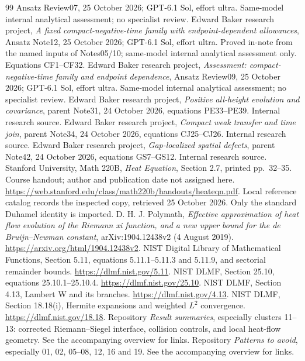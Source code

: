 \documentclass[11pt]{article}
\numberwithin{equation}{section}
\begin{document}
\begin{thebibliography}{99}
Ansatz Review07, 25 October 2026; GPT-6.1 Sol, effort ultra.
Same-model internal analytical assessment; no specialist review.
 Edward Baker research project,
\emph{A fixed compact-negative-time family with endpoint-dependent
allowances}, Ansatz Note12, 25 October 2026; GPT-6.1 Sol, effort ultra.
Proved in-note from the named inputs of Notes05/10; same-model internal
analytical assessment only. Equations CF1--CF32.
 Edward Baker research project,
\emph{Assessment: compact-negative-time family and endpoint dependence},
Ansatz Review09, 25 October 2026; GPT-6.1 Sol, effort ultra.
Same-model internal analytical assessment; no specialist review.
 Edward Baker research project,
\emph{Positive all-height evolution and covariance}, parent Note31,
24 October 2026, equations PE33--PE39. Internal research source.
 Edward Baker research project,
\emph{Compact weak transfer and time join}, parent Note34,
24 October 2026, equations CJ25--CJ26. Internal research source.
 Edward Baker research project,
\emph{Gap-localized spatial defects}, parent Note42,
24 October 2026, equations GS7--GS12. Internal research source.
 Stanford University, Math 220B,
\emph{Heat Equation}, Section 2.7, printed pp.~32--35.
Course handout; author and publication date not assigned here.
\url{https://web.stanford.edu/class/math220b/handouts/heateqn.pdf}.
Local reference catalog records the inspected copy, retrieved
25 October 2026. Only the standard Duhamel identity is imported.
 D. H. J. Polymath,
\emph{Effective approximation of heat flow evolution of the Riemann
xi function, and a new upper bound for the de Bruijn--Newman constant},
arXiv:1904.12438v2 (4 August 2019).
\url{https://arxiv.org/html/1904.12438v2}.
 NIST Digital Library of Mathematical Functions,
Section 5.11, equations 5.11.1--5.11.3 and 5.11.9, and sectorial
remainder bounds. \url{https://dlmf.nist.gov/5.11}.
 NIST DLMF, Section 25.10, equations
25.10.1--25.10.4. \url{https://dlmf.nist.gov/25.10}.
 NIST DLMF, Section 4.13, Lambert W and its branches.
\url{https://dlmf.nist.gov/4.13}.
 NIST DLMF, Section 18.18(i), Hermite expansions
and weighted \(L^2\) convergence. \url{https://dlmf.nist.gov/18.18}.
 Repository \emph{Result summaries}, especially
clusters 11--13: corrected Riemann--Siegel interface, collision controls,
and local heat-flow geometry. See the accompanying overview for links.
 Repository \emph{Patterns to avoid}, especially
01, 02, 05--08, 12, 16 and 19. See the accompanying overview for links.
\end{thebibliography}
\end{document}
